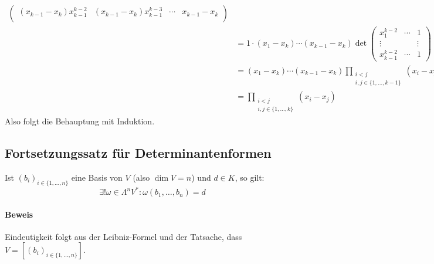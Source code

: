 \begin{Definition}
\begin{align*}
\begin{pmatrix}
					(x_{k-1}-x_k)x_{k-1}^{k-2}& (x_{k-1}-x_k)x_{k-1}^{k-3} & \cdots & x_{k-1}-x_k  \\ 
				\end{pmatrix}\\
			  &= 1\cdot(x_1-x_k)\cdots (x_{k-1}-x_k)\det
				\begin{pmatrix}
				x_1^{k-2} & \cdots & 1 \\ 
				\vdots &  & \vdots \\ 
				x_{k-1}^{k-2} & \cdots & 1
				\end{pmatrix}\\
                                &=(x_1-x_k)\cdots(x_{k-1}-x_k)\prod_{\substack{i<j\\ i,j\in\{1,\dots, k-1 \}}}(x_i-x_j)\\
                                &= \prod_{\substack{i<j\\ i,j\in \{1,\dots,k\}}}(x_i-x_j)
                        \end{align*}
		Also folgt die Behauptung mit Induktion.
	\end{Definition}
\subsection{Fortsetzungssatz für Determinantenformen}
	\begin{Satz}
		Ist $ (b_i)_{i\in \{1,\dots,n\}} $ eine Basis von $ V $ (also $ \dim V = n $) und $ d\in K $, so gilt:
		\[ \exists! \omega\in\Lambda^nV^*:\omega(b_1,\dots,b_n) = d \]
	\end{Satz}
\paragraph{Beweis}
	Eindeutigkeit folgt aus der Leibniz-Formel und der Tatsache, dass $ V=[(b_i)_{i\in\{1,\dots,n\}}] $.
	
